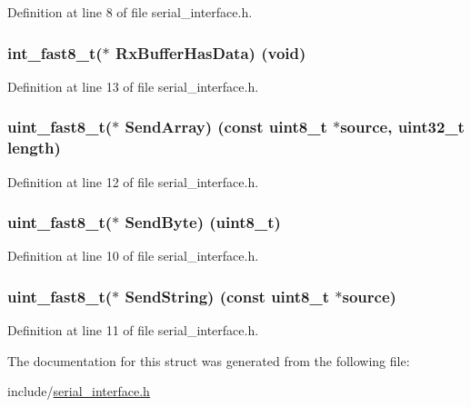 Definition at line 8 of file serial\+\_\+interface.\+h.

\subsubsection[{\texorpdfstring{Rx\+Buffer\+Has\+Data}{RxBufferHasData}}]{\setlength{\rightskip}{0pt plus 5cm}int\+\_\+fast8\+\_\+t($\ast$ Rx\+Buffer\+Has\+Data) (void)}\hypertarget{struct_serial_interface_ace39ec2bddbae9971dd0aab419ccd4b7}{}\label{struct_serial_interface_ace39ec2bddbae9971dd0aab419ccd4b7}


Definition at line 13 of file serial\+\_\+interface.\+h.

\subsubsection[{\texorpdfstring{Send\+Array}{SendArray}}]{\setlength{\rightskip}{0pt plus 5cm}uint\+\_\+fast8\+\_\+t($\ast$ Send\+Array) (const uint8\+\_\+t $\ast$source, uint32\+\_\+t length)}\hypertarget{struct_serial_interface_a7e615bf5681ba25bcaba8afb1cc33c39}{}\label{struct_serial_interface_a7e615bf5681ba25bcaba8afb1cc33c39}


Definition at line 12 of file serial\+\_\+interface.\+h.

\subsubsection[{\texorpdfstring{Send\+Byte}{SendByte}}]{\setlength{\rightskip}{0pt plus 5cm}uint\+\_\+fast8\+\_\+t($\ast$ Send\+Byte) (uint8\+\_\+t)}\hypertarget{struct_serial_interface_a49276961133a48866ca6550472cd2696}{}\label{struct_serial_interface_a49276961133a48866ca6550472cd2696}


Definition at line 10 of file serial\+\_\+interface.\+h.

\subsubsection[{\texorpdfstring{Send\+String}{SendString}}]{\setlength{\rightskip}{0pt plus 5cm}uint\+\_\+fast8\+\_\+t($\ast$ Send\+String) (const uint8\+\_\+t $\ast$source)}\hypertarget{struct_serial_interface_af6bdcb2e604bd52ceba2ffdaffbb4341}{}\label{struct_serial_interface_af6bdcb2e604bd52ceba2ffdaffbb4341}


Definition at line 11 of file serial\+\_\+interface.\+h.



The documentation for this struct was generated from the following file\+:\begin{DoxyCompactItemize}
\item 
include/\hyperlink{serial__interface_8h}{serial\+\_\+interface.\+h}\end{DoxyCompactItemize}
